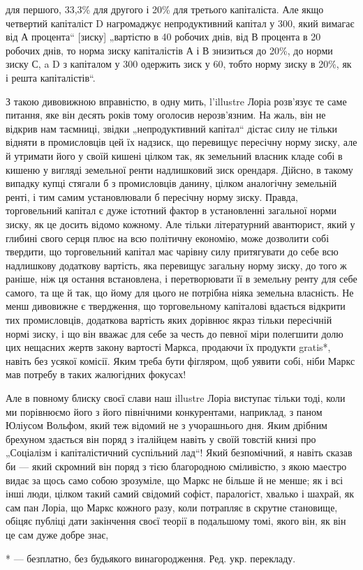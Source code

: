 для першого, 33,3\%  для другого і 20\% для третього капіталіста.
Але якщо четвертий капіталіст D нагромаджує непродуктивний
капітал у 300, який вимагає від А процента“ [зиску]
„вартістю в 40 робочих днів, від В процента в 20 робочих днів,
то норма зиску капіталістів А і В знизиться до 20\%, до норми
зиску С, a D з капіталом у 300 одержить зиск у 60, тобто
норму зиску в 20\%, як і решта капіталістів“.

З такою дивовижною вправністю, в одну мить, l’illustre Лоріа
розв’язує те саме питання, яке він десять років тому оголосив
нерозв’язним. На жаль, він не відкрив нам таємниці, звідки
„непродуктивний капітал“ дістає силу не тільки відняти в промисловців
цей їх надзиск, що перевищує пересічну норму
зиску, але й утримати його у своїй кишені цілком так, як земельний
власник кладе собі в кишеню у вигляді земельної ренти надлишковий
зиск орендаря. Дійсно, в такому випадку купці стягали
б з промисловців данину, цілком аналогічну земельній ренті,
і тим самим установлювали б пересічну норму зиску. Правда,
торговельний капітал є дуже істотний фактор в установленні
загальної норми зиску, як це досить відомо кожному. Але тільки
літературний авантюрист, який у глибині свого серця плює на
всю політичну економію, може дозволити собі твердити, що
торговельний капітал має чарівну силу притягувати до себе
всю надлишкову додаткову вартість, яка перевищує загальну
норму зиску, до того ж раніше, ніж ця остання встановлена,
і перетворювати її в земельну ренту для себе самого, та ще
й так, що йому для цього не потрібна ніяка земельна власність.
Не менш дивовижне є твердження, що торговельному капіталові
вдається відкрити тих промисловців, додаткова вартість яких
дорівнює якраз тільки пересічній нормі зиску, і що він вважає для
себе за честь до певної міри полегшити долю цих нещасних жертв
закону вартості Маркса, продаючи їх продукти gratis*, навіть
без усякої комісії. Яким треба бути фігляром, щоб уявити собі,
ніби Маркс мав потребу в таких жалюгідних фокусах!

Але в повному блиску своєї слави наш illustre Лоріа виступає
тільки тоді, коли ми порівнюємо його з його північними
конкурентами, наприклад, з паном Юліусом Вольфом, який теж
відомий не з учорашнього дня. Яким дрібним брехуном здається він
поряд з італійцем навіть у своїй товстій книзі про „Соціалізм
і капіталістичний суспільний лад“! Який безпомічний, я навіть
сказав би — який скромний він поряд з тією благородною сміливістю,
з якою маестро видає за щось само собою зрозуміле,
що Маркс не більше й не менше; як і всі інші люди, цілком
такий самий свідомий софіст, паралогіст, хвалько і шахрай, як
сам пан Лоріа, що Маркс кожного разу, коли потрапляє в
скрутне становище, обіцяє публіці дати закінчення своєї теорії
в подальшому томі, якого він, як він це сам дуже добре знає,

* — безплатно, без будьякого винагородження. Ред. укр. перекладу.
